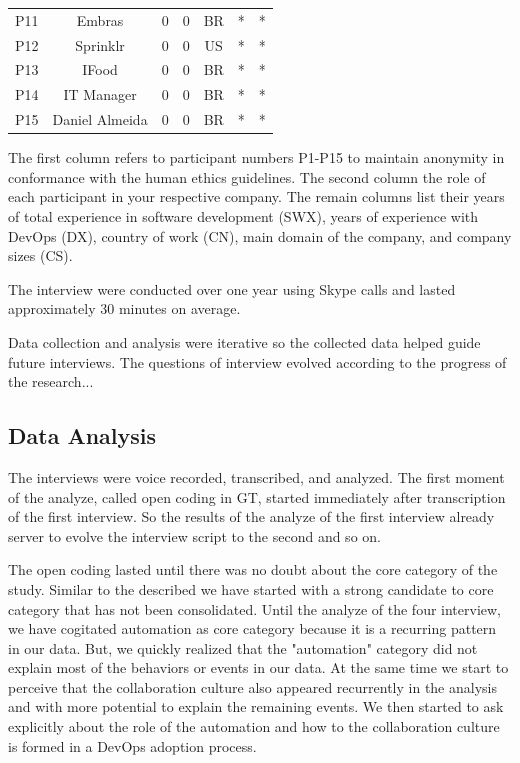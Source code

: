 \begin{table}[t]
\begin{tabular}{ccccccc}
P11                  & Embras                & 0            & 0           & BR            & *                  & *                               \\

P12                  & Sprinklr              & 0            & 0           & US            & *                  & *                               \\

P13                  & IFood                 & 0            & 0           & BR            & *                  & *                               \\

P14                  & IT Manager            & 0            & 0           & BR            & *                  & *                               \\

P15                  & Daniel Almeida        & 0            & 0           & BR            & *                  & *
\end{tabular}
\end{table}

The first column refers to participant numbers P1-P15 to maintain anonymity in
conformance with the human ethics guidelines. The second column the role of
each participant in your respective company. The remain columns list their
years of total experience in software development (SWX), years of experience
with DevOps (DX), country of work (CN), main domain of the company, and company
sizes (CS).

The interview were conducted over one year using Skype calls and lasted
approximately 30 minutes on average.

Data collection and analysis were iterative so the collected data helped guide
future interviews. The questions of interview evolved according to the progress
of the research...

\subsection{Data Analysis}
The interviews were voice recorded, transcribed, and analyzed. The first moment
of the analyze, called open coding in GT, started immediately after
transcription of the first interview. So the results of the analyze of the
first interview already server to evolve the interview script to the second and
so on.

The open coding lasted until there was no doubt about the core category of the
study. Similar to the described \cite{adolph2012reconciling} we have started
with a strong candidate to core category that has not been consolidated. Until
the analyze of the four interview, we have cogitated automation as core
category because it is a recurring pattern in our data. But, we quickly
realized that the "automation" category did not explain most of the behaviors
or events in our data. At the same time we start to perceive that the
collaboration culture also appeared recurrently in the analysis and with more
potential to explain the remaining events. We then started to ask explicitly
about the role of the automation and how to the collaboration culture is formed
in a DevOps adoption process.


